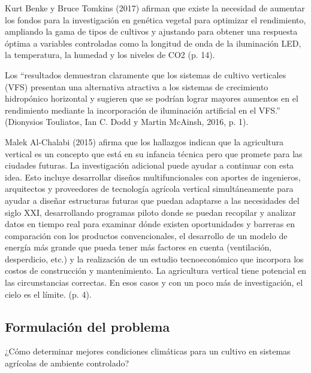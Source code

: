 \documentclass{report}
\begin{document}
Kurt Benke y Bruce Tomkins (2017) afirman que existe la necesidad de aumentar
los fondos para la investigación en genética vegetal para optimizar el
rendimiento, ampliando la gama de tipos de cultivos y ajustando para obtener una
respuesta óptima a variables controladas como la longitud de onda de la
iluminación LED, la temperatura, la humedad y los niveles de CO2 (p. 14).

Los ``resultados demuestran claramente que los sistemas de cultivo
verticales (VFS) presentan una alternativa atractiva a los sistemas de
crecimiento hidropónico horizontal y sugieren que se podrían lograr mayores
aumentos en el rendimiento mediante la incorporación de iluminación artificial
en el VFS.'' (Dionysios Touliatos, Ian C. Dodd y Martin McAinsh, 2016, p. 1).

Malek Al-Chalabi (2015) afirma que los hallazgos indican que la agricultura
vertical es un concepto que está en su infancia técnica pero que promete para
las ciudades futuras. La investigación adicional puede ayudar a continuar con
esta idea. Esto incluye desarrollar diseños multifuncionales con aportes de
ingenieros, arquitectos y proveedores de tecnología agrícola vertical
simultáneamente para ayudar a diseñar estructuras futuras que puedan adaptarse a
las necesidades del siglo XXI, desarrollando programas piloto donde se puedan
recopilar y analizar datos en tiempo real para examinar dónde existen
oportunidades y barreras en comparación con los productos convencionales, el
desarrollo de un modelo de energía más grande que pueda tener más factores en
cuenta (ventilación, desperdicio, etc.) y la realización de un estudio
tecnoeconómico que incorpora los costos de construcción y mantenimiento.
La agricultura vertical tiene potencial en las circunstancias correctas. En esos
casos y con un poco más de investigación, el cielo es el límite. (p. 4).
\subsection{Formulación del problema}
¿Cómo determinar mejores condiciones climáticas para un cultivo en sistemas
agrícolas de ambiente controlado?
\end{document}
